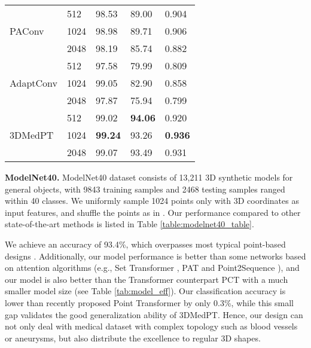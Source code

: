 \documentclass[10pt,twocolumn,letterpaper]{article}
\begin{document}
\begin{table}
\begin{tabular}{l|llll}
\hline
\multirow{3}{*}{PAConv \cite{paconv}}
                            & \cellcolor{Apricot}512      & \cellcolor{Apricot}98.53   & \cellcolor{Apricot}89.00   & \cellcolor{Apricot}0.904  \\
                            & 1024     & 98.98   & 89.71   & 0.906  \\
                            & \cellcolor{Lavender}2048     & \cellcolor{Lavender}98.19   & \cellcolor{Lavender}85.74   & \cellcolor{Lavender}0.882  \\
\hline
\multirow{3}{*}{AdaptConv \cite{adapconv}}
                            & \cellcolor{Apricot}512      & \cellcolor{Apricot}97.58   & \cellcolor{Apricot}79.99   & \cellcolor{Apricot}0.809  \\
                            & 1024     & 99.05   & 82.90   & 0.858  \\
                            & \cellcolor{Lavender}2048     & \cellcolor{Lavender}97.87   & \cellcolor{Lavender}75.94   & \cellcolor{Lavender}0.799  \\ 
\hline
\multirow{3}{*}{3DMedPT}    & \cellcolor{Apricot}512        & \cellcolor{Apricot}99.02            & \cellcolor{Apricot}\textbf{94.06}     & \cellcolor{Apricot}0.920       \\
                            & 1024       & \textbf{99.24}   & 93.26              & \textbf{0.936}       \\
                            & \cellcolor{Lavender}2048       & \cellcolor{Lavender}99.07            & \cellcolor{Lavender}93.49              &  \cellcolor{Lavender}0.931      \\
\bottomrule
\end{tabular}
\end{table}

\noindent \textbf{ModelNet40.}
ModelNet40 dataset \cite{wu20153d} consists of 13,211 3D synthetic models for general objects, with 9843 training samples and 2468 testing samples ranged within 40 classes.
We uniformly sample 1024 points only with 3D coordinates as input features, and shuffle the points as in \cite{qi2017pointnet2}.
Our performance compared to other state-of-the-art methods is listed in Table \ref{table:modelnet40_table}.

We achieve an accuracy of 93.4\%, which overpasses most typical point-based designs \cite{xu2020geometry, wu2019pointconv, wang2019dynamic}.
Additionally, our model performance is better than some networks based on attention algorithms (e.g., Set Transformer \cite{lee2019set}, PAT \cite{pat} and Point2Sequence \cite{p2seq}), and our model is also better than the Transformer counterpart PCT \cite{guo2020pct} with a much smaller model size (see Table \ref{tab:model_eff}).
Our classification accuracy is lower than recently proposed Point Transformer \cite{pt} by only 0.3\%, while this small gap validates the good generalization ability of 3DMedPT. Hence, our design can not only deal with medical dataset with complex topology such as blood vessels or aneurysms, but also distribute the excellence to regular 3D shapes.
\end{document}

